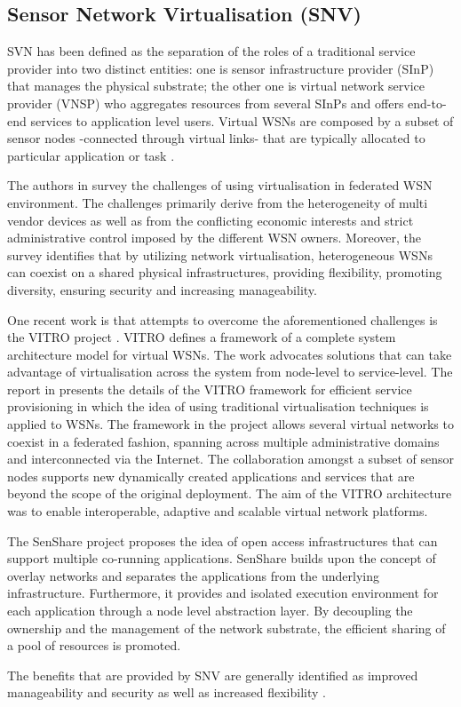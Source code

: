\subsection{Sensor Network Virtualisation (SNV)}
SVN has been defined \cite{islam2012survey,Chowdhury2009Network} as the separation of the roles of a traditional service provider into two distinct entities: one is sensor infrastructure provider (SInP) that manages the physical substrate; the other one is virtual network service provider (VNSP) who aggregates resources from several SInPs and offers end-to-end services to application level users. Virtual WSNs are composed by a subset of sensor nodes -connected through virtual links- that are typically allocated to particular application or task \cite{Lim:2009:VFH:1644038.1644080}.

The authors in \cite{islam2012virtualization} survey the challenges of using virtualisation in federated WSN environment. The challenges primarily derive from the heterogeneity of multi vendor devices as well as from the conflicting economic interests and strict administrative control imposed by the different WSN owners. Moreover, the survey identifies that by utilizing network virtualisation, heterogeneous WSNs can coexist on a shared physical infrastructures, providing flexibility, promoting diversity, ensuring security and increasing manageability.

One recent work is that attempts to overcome the aforementioned challenges is the VITRO project \cite{6076694}. VITRO defines a framework of a complete system architecture model for virtual WSNs. The work advocates solutions that can take advantage of virtualisation across the system from node-level to service-level. The report in \cite{sarakis2012framework} presents the details of the VITRO framework for efficient service provisioning in which the idea of using traditional virtualisation techniques is applied to WSNs. The framework in the project allows several virtual networks to coexist in a federated fashion, spanning across multiple administrative domains and interconnected via the Internet. The collaboration amongst a subset of sensor nodes supports new dynamically created applications and services that are beyond the scope of the original deployment. The aim of the VITRO architecture was to enable interoperable, adaptive and scalable virtual network platforms. 

The SenShare \cite{FRESnel_multi_application_WSN} project proposes the idea of open access infrastructures that can support multiple co-running applications. SenShare builds upon the concept of overlay networks and separates the applications from the underlying infrastructure. Furthermore, it provides and isolated execution environment for each application through a node level abstraction layer. By decoupling the ownership and the management of the network substrate, the efficient sharing of a pool of resources is promoted.
 
The benefits that are provided by SNV are generally identified as improved manageability and security as well as increased flexibility \cite{Chowdhury2009Network}.